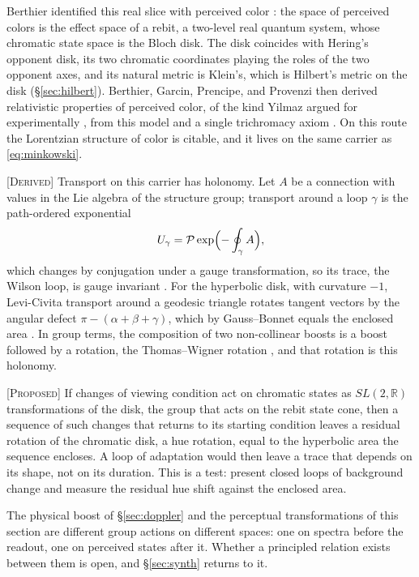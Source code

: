\documentclass[11pt]{article}
\theoremstyle{boldplain}
\theoremstyle{boldupright}
\newcommand{\derived}{[\textup{\textsc{Derived}}]}
\newcommand{\proposed}{[\textup{\textsc{Proposed}}]}
\begin{document}
Berthier identified this real slice with perceived color \cite{berthier2020}: the space of perceived colors is the
effect space of a rebit, a two-level real quantum system, whose chromatic state space is the Bloch
disk. The disk coincides with Hering's opponent disk, its two chromatic coordinates playing the
roles of the two opponent axes, and its natural metric is Klein's, which is Hilbert's metric on the
disk (\S\ref{sec:hilbert}). Berthier, Garcin, Prencipe, and Provenzi then derived relativistic properties of perceived
color, of the kind Yilmaz argued for experimentally \cite{yilmaz1962}, from this model and a single trichromacy
axiom \cite{berthier2021}. On this route the Lorentzian structure of color is citable, and it lives on the same carrier
as \eqref{eq:minkowski}.

\derived{} Transport on this carrier has holonomy. Let $A$ be a connection with values in the
Lie algebra of the structure group; transport around a loop $\gamma$ is the path-ordered exponential
\begin{equation}\label{eq:holonomy}
U_\gamma=\mathcal{P}\exp\Bigl(-\oint_\gamma A\Bigr),
\end{equation}
which changes by conjugation under a gauge transformation, so its trace, the Wilson loop, is gauge
invariant \cite{kobayashi1963,wu1975}. For the hyperbolic disk, with curvature $-1$, Levi-Civita transport around a
geodesic triangle rotates tangent vectors by the angular defect $\pi-(\alpha+\beta+\gamma)$, which by Gauss--Bonnet
equals the enclosed area \cite{docarmo1976}. In group terms, the composition of two non-collinear boosts is a boost
followed by a rotation, the Thomas--Wigner rotation \cite{thomas1926,wigner1939}, and that rotation is this holonomy.

\proposed{} If changes of viewing condition act on chromatic states as $SL(2,\mathbb{R})$ transformations
of the disk, the group that acts on the rebit state cone, then a sequence of such changes that returns
to its starting condition leaves a residual rotation of the chromatic disk, a hue rotation, equal to the
hyperbolic area the sequence encloses. A loop of adaptation would then leave a trace that depends
on its shape, not on its duration. This is a test: present closed loops of background change and
measure the residual hue shift against the enclosed area.

The physical boost of \S\ref{sec:doppler} and the perceptual transformations of this section are different group
actions on different spaces: one on spectra before the readout, one on perceived states after it.
Whether a principled relation exists between them is open, and \S\ref{sec:synth} returns to it.
\end{document}

